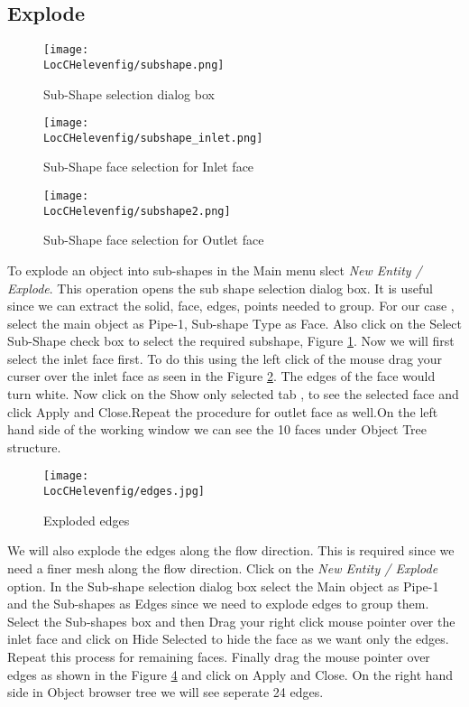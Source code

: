 \subsection*{Explode}

\begin{figure}[h]  
\centering
\texttt{[image: \\LocCHelevenfig/subshape.png]}
\caption{Sub-Shape selection dialog box}
\label{subshape}
\end{figure}

\begin{figure}[h]  
\centering
\texttt{[image: \\LocCHelevenfig/subshape\_inlet.png]}
\caption{Sub-Shape face selection for Inlet face}
\label{subshape_inlet}
\end{figure}

\begin{figure}[h]  
\centering
\texttt{[image: \\LocCHelevenfig/subshape2.png]}
\caption{Sub-Shape face selection for Outlet face}
\label{subshape_outlet}
\end{figure}

To explode an object into sub-shapes in the Main menu slect \textit{New Entity / Explode}. This operation opens the sub shape selection dialog box. It is useful since we can extract the solid, face, edges, points needed to group. For our case , select the main object as Pipe-1, Sub-shape Type as Face. Also click on the Select Sub-Shape check box to select the required subshape, Figure \ref{subshape}. Now we will first select the inlet face first. To do this using the left click of the mouse drag your curser over the inlet face as seen in the Figure \ref{subshape_inlet}. The edges of the face would turn white. Now click on the Show only selected tab , to see the selected face and click Apply and Close.Repeat the procedure for outlet face as well.On the left hand side of the working window we can see the 10 faces under Object Tree structure. \newline

\begin{figure}[h]  
\centering
\texttt{[image: \\LocCHelevenfig/edges.jpg]}
\caption{Exploded edges}
\label{edges}
\end{figure}

\flushleft We will also explode the edges along the flow direction. This is required since we need a finer mesh along the flow direction. Click on the \textit{New Entity / Explode} option. In the Sub-shape selection dialog box select the Main object as Pipe-1 and the Sub-shapes as Edges since we need to explode edges to group them. Select the Sub-shapes box and then Drag your right click mouse pointer over the inlet face and click on Hide Selected to hide the face as we want only the edges. Repeat this process for remaining faces. Finally drag the mouse pointer over edges as shown in the Figure \ref{edges} and click on Apply and Close. On the right hand side in Object browser tree we will see seperate 24 edges.

